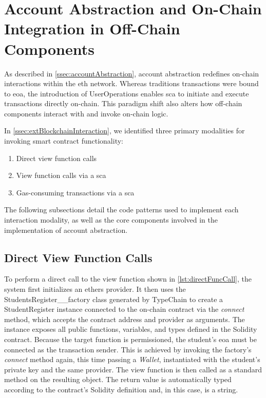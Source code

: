 \section{Account Abstraction and On-Chain Integration in Off-Chain Components}
As described in \cref{ssec:accountAbstraction}, account abstraction redefines on-chain interactions within the \acrlong{eth} network. Whereas traditions transactions were bound to \acrlong{eoa}, the introduction of UserOperations enables \acrlong{sca} to initiate and execute transactions directly on-chain. This paradigm shift also alters how off-chain components interact with and invoke on-chain logic.

In \cref{ssec:extBlockchainInteraction}, we identified three primary modalities for invoking smart contract functionality:
\begin{enumerate}
    \item Direct view function calls
    \item View function calls via a \acrlong{sca}
    \item Gas-consuming transactions via a \acrlong{sca}
\end{enumerate}
The following subsections detail the code patterns used to implement each interaction modality, as well as the core components involved in the implementation of account abstraction.

\subsection{Direct View Function Calls}
To perform a direct call to the view function shown in \cref{lst:directFuncCall}, the system first initializes an ethers provider. It then uses the StudentsRegister\_\_factory class generated by TypeChain to create a StudentRegister instance connected to the on-chain contract via the \textit{connect} method, which accepts the contract address and provider as arguments. The instance exposes all public functions, variables, and types defined in the Solidity contract. 
Because the target function is permissioned, the student's \acrshort{eoa} must be connected as the transaction sender. This is achieved by invoking the factory's \textit{connect} method again, this time passing a \textit{Wallet}, instantiated with the student's private key and the same provider. The view function is then called as a standard method on the resulting object. The return value is automatically typed according to the contract's Solidity definition and, in this case, is a string.

